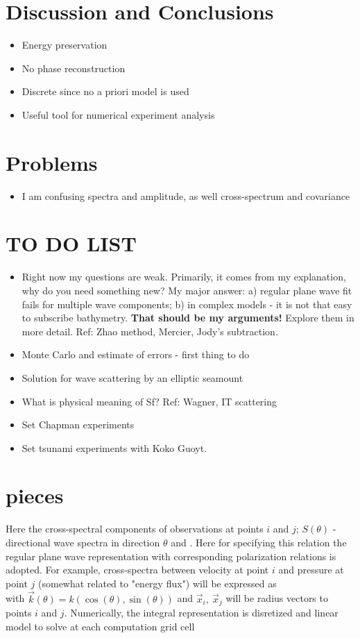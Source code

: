 \section{Discussion and Conclusions}
\begin{itemize}
\item Energy preservation
\item No phase reconstruction
\item Discrete since no a priori model is used
\item Useful tool for numerical experiment analysis
\end{itemize}




\section{Problems}
\begin{itemize}
\item I am confusing spectra and amplitude, as well cross-spectrum and covariance
\end{itemize}
\section{TO DO LIST}
\begin{itemize}
\item Right now my questions are weak. Primarily, it comes from my explanation, why do you need something new? My major answer: a) regular plane wave fit fails for multiple wave components; b) in complex models - it is not that easy to subscribe bathymetry. \textbf{That should be my arguments!} Explore them in more detail. Ref: Zhao method, Mercier, Jody's subtraction.

\item Monte Carlo and estimate of errors - first thing to do

\item Solution for wave scattering by an elliptic seamount

\item What is physical meaning of Sf? Ref: Wagner, IT scattering

\item Set Chapman experiments

\item Set tsunami experiments with Koko Guoyt.
\end{itemize}
\section{pieces}
Here the cross-spectral components of observations at points $i$ and $j$; $S(\theta)$ - directional wave spectra in direction $\theta$ and . Here for specifying this relation the regular plane wave representation with corresponding polarization relations is adopted. For example, cross-spectra between velocity at point $i$ and pressure at point $j$ (somewhat related to "energy flux") will be expressed as\\

with $\vec{k}(\theta) = k (\cos(\theta), \sin (\theta))$ and $\vec{x}_i,~\vec{x}_j$ will be radius vectors to points $i$ and $j$. Numerically, the integral representation is disretized and linear model to solve at each computation grid cell\\

